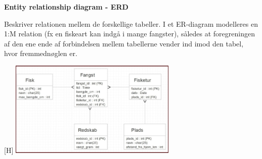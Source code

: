 \textbf{Entity relationship diagram - ERD}

Beskriver relationen mellem de forskellige tabeller. I et ER-diagram modelleres en 1:M relation
(fx en fiskeart kan indgå i mange fangster), således at foregreningen af den ene ende af forbindelsen
mellem tabellerne vender ind imod den tabel, hvor fremmednøglen er.

\begin{center}[H]
	\includegraphics[width=0.6\textwidth]{Images/ERD.png}
\end{center}
